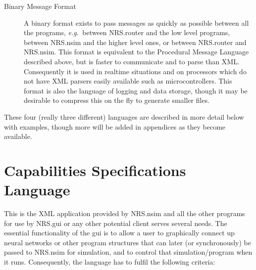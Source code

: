 \documentclass[pdftex,a4paper]{article}
\newcommand{\eg}{{\em e.g.\ }}
\begin{document}
\begin{description}
\item[Binary Message Format] A binary format exists to pass messages
  as quickly as possible between all the programs, \eg between
  NRS.router and the low level programs, between NRS.nsim and the
  higher level ones, or between NRS.router and NRS.nsim. This format is
  equivalent to the Procedural Message Language described above, but
  is faster to communicate and to parse than XML.  Consequently it is
  used in realtime situations and on processors which do not have XML
  parsers easily available such as microcontrollers. This format is
  also the language of logging and data storage, though it may be
  desirable to compress this on the fly to generate smaller files.

\end{description}

These four (really three different) languages are described in more
detail below with examples, though more will be added in appendices as
they become available.

\section{Capabilities Specifications Language}
\label{sec:csl}

This is the XML application provided by NRS.nsim and all the other
programs for use by NRS.gui or any other potential client serves several
needs. The essential functionality of the gui is to allow a user to
graphically connect up neural networks or other program structures that
can later (or synchronously) be passed to NRS.nsim for simulation, and to
control that simulation/program when it runs. Consequently, the language
has to fulfil the following criteria:
\end{document}
